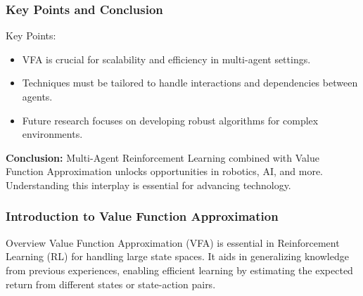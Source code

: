 \documentclass[aspectratio=169]{beamer}
\begin{document}
\begin{frame}[fragile]
    \frametitle{Key Points and Conclusion}
    \begin{block}{Key Points:}
        \begin{itemize}
            \item VFA is crucial for scalability and efficiency in multi-agent settings.
            \item Techniques must be tailored to handle interactions and dependencies between agents.
            \item Future research focuses on developing robust algorithms for complex environments.
        \end{itemize}
    \end{block}
    
    \textbf{Conclusion:} Multi-Agent Reinforcement Learning combined with Value Function Approximation unlocks opportunities in robotics, AI, and more. Understanding this interplay is essential for advancing technology.
\end{frame}

\begin{frame}[fragile]
    \frametitle{Introduction to Value Function Approximation}
    \begin{block}{Overview}
        Value Function Approximation (VFA) is essential in Reinforcement Learning (RL) for handling large state spaces. It aids in generalizing knowledge from previous experiences, enabling efficient learning by estimating the expected return from different states or state-action pairs.
    \end{block}
\end{frame}
\end{document}
